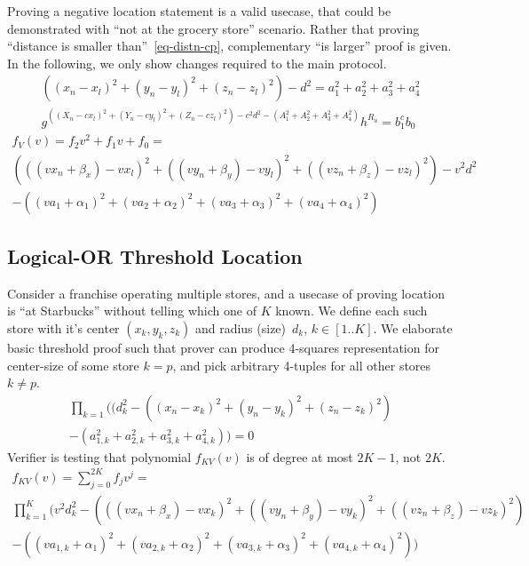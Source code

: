 \documentclass{article}
\begin{document}
Proving a negative location statement is a valid usecase,
that could be demonstrated with ``not at the grocery store'' scenario.
Rather that proving ``distance is smaller than''~\eqref{eq-distn-cp},
complementary ``is larger'' proof is given. %
In the following, we only show changes required to the main protocol.
\begin{gather}
\label{eq-distn-more}
  ((x_n - x_l)^2 + (y_n - y_l)^2 + (z_n - z_l)^2) - d^2 = a_1^2 + a_2^2 + a_3^2 + a_4^2  \\
\label{verf-distn-more}
  g^{((X_n - c x_l)^2 + (Y_n - c y_l)^2 + (Z_n - c z_l)^2 ) - c^2 d^2 - (A_1^2 + A_2^2 + A_3^2 + A_4^2)} h^{R_a} = b_1^{c} b_0 
\end{gather}
\begin{multline}
\label{eq-coeff-more}
  f_V(v) = f_2 v^2 + f_1 v + f_0 = \\
  (((v x_n + \beta_x) - v x_l)^2 +
   ((v y_n + \beta_y) - v y_l)^2 +
   ((v z_n + \beta_z) - v z_l)^2)
  - v^2 d^2 \\
  - ((v a_1 + \alpha_1)^2 +
     (v a_2 + \alpha_2)^2 +
     (v a_3 + \alpha_3)^2 +
     (v a_4 + \alpha_4)^2)
\end{multline}

\subsection{Logical-OR Threshold Location}

Consider a franchise operating multiple stores,
and a usecase of proving location is ``at Starbucks'' without telling which one of $K$ known.
We define each such store with it's center $(x_k, y_k, z_k)$ and radius (size)~$d_k$, $k \in [1 .. K]$.
We elaborate basic threshold proof such that prover can produce
4-squares representation for center-size of some store $k=p$,
and pick arbitrary 4-tuples for all other stores $k \ne p$.
\begin{multline}
\label{eq-distn-or}
  \prod_{k=1}
    ((d_k^2 - ((x_n - x_k)^2 + (y_n - y_k)^2 + (z_n - z_k)^2) \\
     - (a_{1, k}^2 + a_{2, k}^2 + a_{3, k}^2 + a_{4, k}^2)) = 0
\end{multline}
Verifier is testing that polynomial $f_{KV}(v)$ is of degree at most $2K-1$, not $2K$.
\begin{multline}
  f_{KV}(v) = \sum_{j=0}^{2K} f_j v^j = \\
  \prod_{k=1}^{K} (
    v^2 d_k^2 - (((v x_n + \beta_x) - v x_k)^2 +
               ((v y_n + \beta_y) - v y_k)^2 +
               ((v z_n + \beta_z) - v z_k)^2)  \\
        - ((v a_{1,k} + \alpha_1)^2 +
           (v a_{2,k} + \alpha_2)^2 +
           (v a_{3,k} + \alpha_3)^2 +
           (v a_{4,k} + \alpha_4)^2) )
\end{multline}



% 


\end{document}

